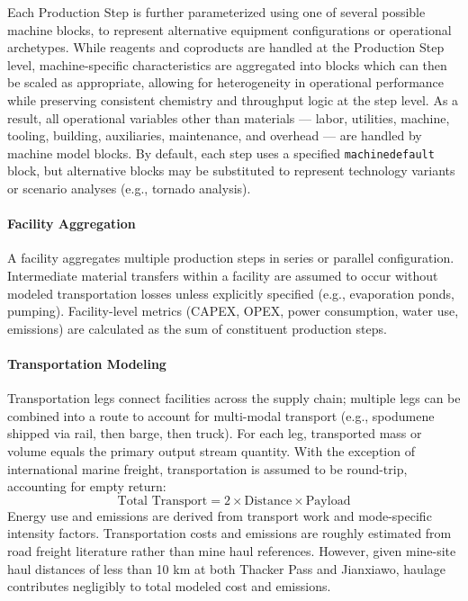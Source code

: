 \documentclass{article}
\renewcommand\_{\textunderscore\allowbreak}
\begin{document}
Each Production Step is further parameterized using one of several possible machine blocks, to represent alternative equipment configurations or operational archetypes. While reagents and coproducts are handled at the Production Step level, machine-specific characteristics are aggregated into blocks which can then be scaled as appropriate, allowing for heterogeneity in operational performance while preserving consistent chemistry and throughput logic at the step level. As a result, all operational variables other than materials --- labor, utilities, machine, tooling, building, auxiliaries, maintenance, and overhead --- are handled by machine model blocks. By default, each step uses a specified \texttt{machine\_default} block, but alternative blocks may be substituted to represent technology variants or scenario analyses (e.g., tornado analysis).

\paragraph{Facility Aggregation}\label{app:04-methods-system-facilities}\leavevmode\par

A facility aggregates multiple production steps in series or parallel configuration. Intermediate material transfers within a facility are assumed to occur without modeled transportation losses unless explicitly specified (e.g., evaporation ponds, pumping). Facility-level metrics (CAPEX, OPEX, power consumption, water use, emissions) are calculated as the sum of constituent production steps.

\paragraph{Transportation Modeling}\label{app:04-methods-system-transport}\leavevmode\par

Transportation legs connect facilities across the supply chain; multiple legs can be combined into a route to account for multi-modal transport (e.g., spodumene shipped via rail, then barge, then truck). For each leg, transported mass or volume equals the primary output stream quantity. With the exception of international marine freight, transportation is assumed to be round-trip, accounting for empty return:
\begin{equation}
    \text{Total Transport} = 2 \times \text{Distance} \times \text{Payload}
\end{equation}
Energy use and emissions are derived from transport work and mode-specific intensity factors. Transportation costs and emissions are roughly estimated from road freight literature \cite{mulhollandCO2EmissionsTrucks2023} rather than mine haul references. However, given mine-site haul distances of less than 10 km at both Thacker Pass and Jianxiawo, haulage contributes negligibly to total modeled cost and emissions. 
\end{document}
